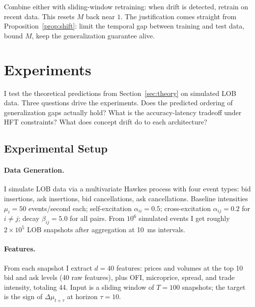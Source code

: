 \documentclass[11pt]{article}
\theoremstyle{definition}
\theoremstyle{remark}
\begin{document}
Combine either with sliding-window retraining: when drift is detected, retrain on recent data.
This resets $M$ back near $1$.
The justification comes straight from Proposition~\ref{prop:shift}: limit the temporal gap between training and test data, bound $M$, keep the generalization guarantee alive.


\section{Experiments}\label{sec:experiments}

I test the theoretical predictions from Section~\ref{sec:theory} on simulated LOB data.
Three questions drive the experiments.
Does the predicted ordering of generalization gaps actually hold?
What is the accuracy-latency tradeoff under HFT constraints?
What does concept drift do to each architecture?

\subsection{Experimental Setup}\label{sec:exp:setup}

\paragraph{Data Generation.}
I simulate LOB data via a multivariate Hawkes process with four event types: bid insertions, ask insertions, bid cancellations, ask cancellations.
Baseline intensities $\mu_i = 50$ events/second each; self-excitation $\alpha_{ii} = 0.5$; cross-excitation $\alpha_{ij} = 0.2$ for $i \neq j$; decay $\beta_{ij} = 5.0$ for all pairs.
From $10^6$ simulated events I get roughly $2 \times 10^5$ LOB snapshots after aggregation at 10~ms intervals.

\paragraph{Features.}
From each snapshot I extract $d = 40$ features: prices and volumes at the top 10 bid and ask levels (40 raw features), plus OFI, microprice, spread, and trade intensity, totaling 44.
Input is a sliding window of $T = 100$ snapshots; the target is the sign of $\Delta \mu_{t+\tau}$ at horizon $\tau = 10$.
\end{document}

